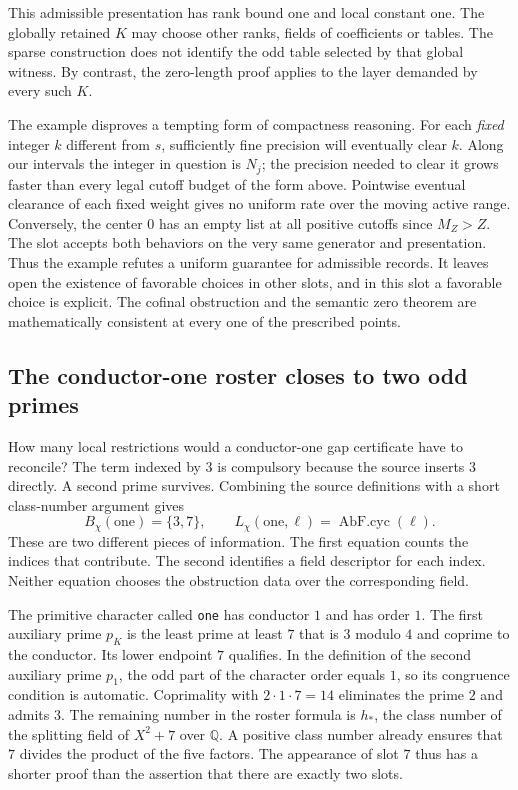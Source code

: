 \documentclass[12pt,letterpaper]{article}
\begin{document}
This admissible presentation has rank bound one and local constant one. The globally retained \(K\) may choose other ranks, fields of coefficients or tables. The sparse construction does not identify the odd table selected by that global witness. By contrast, the zero-length proof applies to the layer demanded by every such \(K\).

The example disproves a tempting form of compactness reasoning. For each \emph{fixed} integer \(k\) different from \(s\), sufficiently fine precision will eventually clear \(k\). Along our intervals the integer in question is \(N_j\); the precision needed to clear it grows faster than every legal cutoff budget of the form above. Pointwise eventual clearance of each fixed weight gives no uniform rate over the moving active range. Conversely, the center 0 has an empty list at all positive cutoffs since \(M_Z>Z\). The slot accepts both behaviors on the very same generator and presentation. Thus the example refutes a uniform guarantee for admissible records. It leaves open the existence of favorable choices in other slots, and in this slot a favorable choice is explicit. The cofinal obstruction and the semantic zero theorem are mathematically consistent at every one of the prescribed points.


\subsection{The conductor-one roster closes to two odd primes}

How many local restrictions would a conductor-one gap certificate have to reconcile? The term indexed by $3$ is compulsory because the source inserts $3$ directly. A second prime survives. Combining the source definitions with a short class-number argument gives
\[
 B_{\chi}(\mathrm{one})=\{3,7\},\qquad
 L_{\chi}(\mathrm{one},\ell)=\operatorname{AbF.cyc}(\ell).
\]
These are two different pieces of information. The first equation counts the indices that contribute. The second identifies a field descriptor for each index. Neither equation chooses the obstruction data over the corresponding field.

The primitive character called \texttt{one} has conductor $1$ and has order $1$. The first auxiliary prime $p_K$ is the least prime at least $7$ that is $3$ modulo $4$ and coprime to the conductor. Its lower endpoint $7$ qualifies. In the definition of the second auxiliary prime $p_1$, the odd part of the character order equals $1$, so its congruence condition is automatic. Coprimality with $2\cdot1\cdot7=14$ eliminates the prime $2$ and admits $3$. The remaining number in the roster formula is $h_*$, the class number of the splitting field of $X^2+7$ over $\mathbb{Q}$. A positive class number already ensures that $7$ divides the product of the five factors. The appearance of slot $7$ thus has a shorter proof than the assertion that there are exactly two slots.
\end{document}
